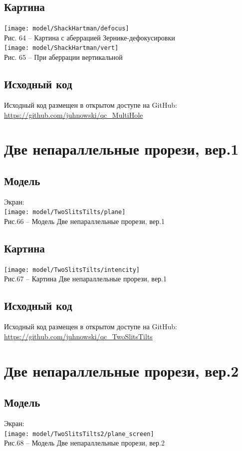 \documentclass[11pt]{report}
\begin{document}
\subsection{Картина}

\texttt{[image: model/ShackHartman/defocus]} \\
Рис. 64 -- Картина с аберрацией Зернике-дефокусировки \\

\texttt{[image: model/ShackHartman/vert]} \\
Рис. 65 -- При аберрации вертикальной \\
\subsection{Исходный код}
Исходный код размещен в открытом доступе на GitHub: \url{https://github.com/juhnowski/qc_MultiHole}\\


\section{Две непараллельные прорези, вер.1}
\subsection{Модель}
Экран:\\
\texttt{[image: model/TwoSlitsTilts/plane]} \\
Рис.66 -- Модель Две непараллельные прорези, вер.1 \\
\subsection{Картина}
\texttt{[image: model/TwoSlitsTilts/intencity]} \\
Рис.67 -- Картина Две непараллельные прорези, вер.1 \\
\subsection{Исходный код}
Исходный код размещен в открытом доступе на GitHub: \url{https://github.com/juhnowski/qc_TwoSlitsTilts}\\

\section{Две непараллельные прорези, вер.2}
\subsection{Модель}
Экран:\\
\texttt{[image: model/TwoSlitsTilts2/plane\_screen]}\\
Рис.68 -- Модель Две непараллельные прорези, вер.2 \\
\end{document}
